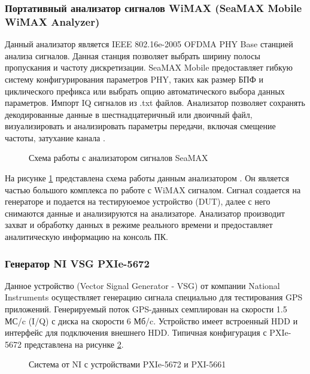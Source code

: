 \subsubsection*{Портативный анализатор сигналов WiMAX (SeaMAX Mobile WiMAX Analyzer)}
Данный анализатор является IEEE 802.16e-2005 OFDMA PHY Base станцией анализа сигналов. Данная станция 
позволяет выбрать ширину полосы пропускания и частоту дискретизации.
SeaMAX Mobile предоставляет гибкую систему конфигурирования параметров PHY, таких как
размер БПФ и циклического префикса или выбрать опцию автоматического выбора данных параметров. Импорт IQ сигналов
из .txt файлов. Анализатор позволяет сохранять декодированные данные в шестнадцатеричный или двоичный файл,
визуализировать и анализировать параметры передачи, включая смещение частоты, затухание канала
\cite{seamax_overview, seamax_pdf}.

\begin{figure}[h]
\caption{Схема работы с анализатором сигналов SeaMAX}
\label{pic:seamax}
\end{figure}

На рисунке \ref{pic:seamax} представлена схема работы данным анализатором \cite{seamax_pdf}. Он является частью большого комплекса по работе
с WiMAX сигналом. Сигнал создается на генераторе и подается на тестируюемое устройство (DUT), далее с него снимаются 
данные и анализируются на анализаторе. Анализатор производит захват и обработку данных в режиме реального времени и
предоставляет аналитическую информацию на консоль ПК.

\subsubsection*{Генератор NI VSG PXIe-5672}
\label{sec:vsg}
Данное устройство (Vector Signal Generator - VSG) от компании National Instruments осуществляет генерацию сигнала специально для тестирования
GPS приложений. Генерируемый поток GPS-данных семплирован на скорости 1.5 МС/c (I/Q) с диска на скорости 6 Мб/c.
Устройство имеет встроенный HDD и интерфейс для подключения внешнего HDD. Типичная конфигурация с PXIe-5672
представлена на рисунке \ref{pic:ni_system}.

\begin{figure}[H]
\begin{center}
\end{center}
\caption{Система от NI с устройствами PXIe-5672 и PXI-5661}
\label{pic:ni_system}
\end{figure}

